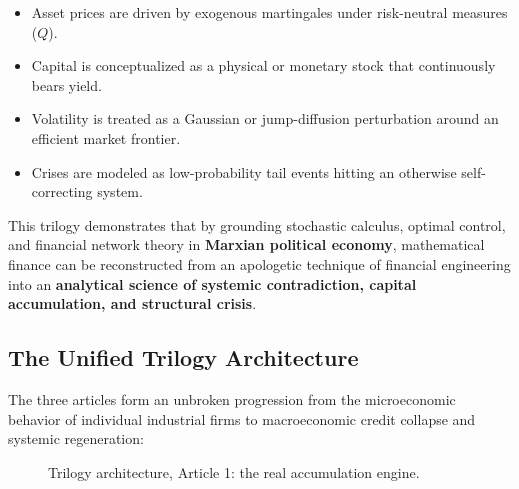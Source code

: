 \documentclass[11pt,letterpaper]{report}
\begin{document}
\begin{itemize}
\item Asset prices are driven by exogenous martingales under risk-neutral measures ($Q$).
\item Capital is conceptualized as a physical or monetary stock that continuously bears yield.
\item Volatility is treated as a Gaussian or jump-diffusion perturbation around an efficient market frontier.
\item Crises are modeled as low-probability tail events hitting an otherwise self-correcting system.
\end{itemize}
This trilogy demonstrates that by grounding stochastic calculus, optimal control, and financial network theory in \textbf{Marxian political economy}, mathematical finance can be reconstructed from an apologetic technique of financial engineering into an \textbf{analytical science of systemic contradiction, capital accumulation, and structural crisis}.

\subsection{The Unified Trilogy Architecture}
The three articles form an unbroken progression from the microeconomic behavior of individual industrial firms to macroeconomic credit collapse and systemic regeneration:

\begin{figure}[H]\centering
{}
\caption{Trilogy architecture, Article 1: the real accumulation engine.}
\end{figure}
\end{document}
